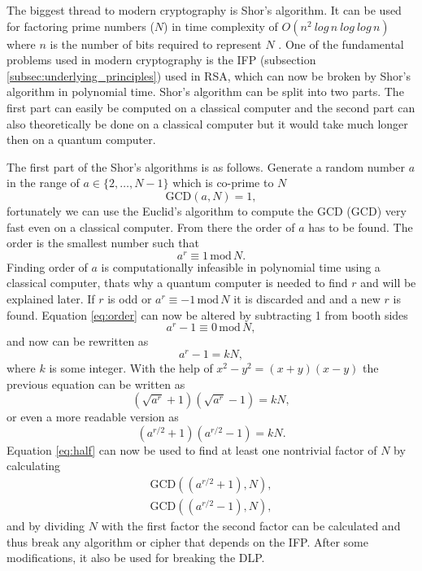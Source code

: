 The biggest thread to modern cryptography is Shor's algorithm. It can be used for factoring prime numbers ($N$) in time complexity of $O(n^2\ log\,n\ log\ log\,n)$ where $n$ is the number of bits required to represent $N$ \cite{Yanofsky2008}. One of the fundamental problems used in modern cryptography is the IFP (subsection \ref{subsec:underlying_principles}) used in RSA, which can now be broken by Shor’s algorithm in polynomial time. Shor's algorithm can be split into two parts. The first part can easily be computed on a classical computer and the second part can also theoretically be done on a classical computer but it would take much longer then on a quantum computer.

The first part of the Shor's algorithms is as follows. Generate a random number $a$ in the range of $a\in\{2,\dots,N-1\}$ which is co-prime to $N$
\begin{equation}
  \mathrm{GCD}(a, N) = 1,
\end{equation}
fortunately we can use the Euclid's algorithm to compute the GCD (\acl{GCD}) very fast even on a classical computer. From there the order of $a$ has to be found. The order is the smallest number such that
\begin{equation}
  \label{eq:order}
  a^r \equiv 1\,\mathrm{mod}\,N.
\end{equation}
Finding order of $a$ is computationally infeasible in polynomial time using a classical computer, thats why a quantum computer is needed to find $r$ and will be explained later. If $r$ is odd or $a^r\equiv-1\,\mathrm{mod}\,N$ it is discarded and and a new $r$ is found. Equation \ref{eq:order} can now be altered by subtracting 1 from booth sides
\begin{equation}
  a^r -1\equiv 0\,\mathrm{mod}\,N,
\end{equation}
and now can be rewritten as
\begin{equation}
  a^r -1=kN,
\end{equation}
where $k$ is some integer. With the help of $x^2 - y^2=(x+y)(x-y)$ the previous equation can be written as
\begin{equation}
  (\sqrt{a^r}+1)(\sqrt{a^r}-1)= kN,
\end{equation}
or even a more readable version as
\begin{equation}
  \label{eq:half}
  (a^{r/2}+1)(a^{r/2}-1)= kN.
\end{equation}
Equation \ref{eq:half} can now be used to find at least one nontrivial factor of $N$ by calculating
\begin{equation}
  \begin{aligned}
    \mathrm{GCD}((a^{r/2}+1), N), \\
    \mathrm{GCD}((a^{r/2}-1), N),
  \end{aligned}
\end{equation}
and by dividing $N$ with the first factor the second factor can be calculated and thus break any algorithm or cipher that depends on the IFP. After some modifications, it also be used for breaking the DLP. \cite{Yanofsky2008}\cite{Pittenger2000}

